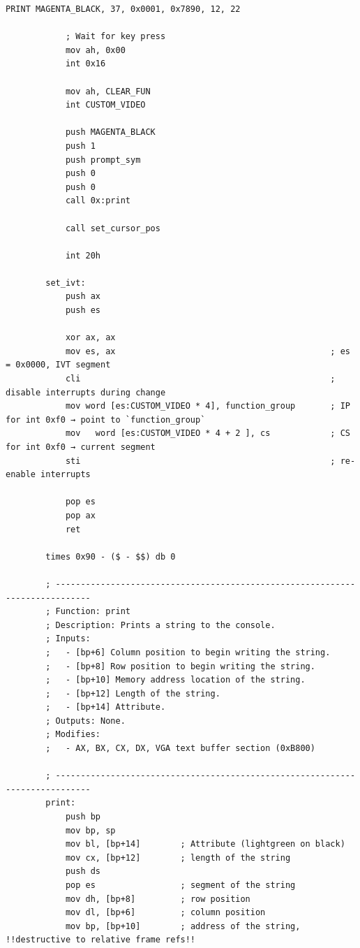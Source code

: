 \documentclass{article}
\begin{document}
\begin{lstlisting}[caption={os623V05.asm listing}, captionpos=t]
            PRINT MAGENTA_BLACK, 37, 0x0001, 0x7890, 12, 22

            ; Wait for key press
            mov ah, 0x00
            int 0x16

            mov ah, CLEAR_FUN
            int CUSTOM_VIDEO

            push MAGENTA_BLACK
            push 1
            push prompt_sym
            push 0
            push 0
            call 0x:print

            call set_cursor_pos

            int 20h

        set_ivt:
            push ax
            push es

            xor ax, ax
            mov es, ax                                           ; es = 0x0000, IVT segment
            cli                                                  ; disable interrupts during change
            mov word [es:CUSTOM_VIDEO * 4], function_group       ; IP for int 0xf0 → point to `function_group`
            mov   word [es:CUSTOM_VIDEO * 4 + 2 ], cs            ; CS for int 0xf0 → current segment
            sti                                                  ; re-enable interrupts

            pop es
            pop ax
            ret

        times 0x90 - ($ - $$) db 0

        ; -----------------------------------------------------------------------------
        ; Function: print
        ; Description: Prints a string to the console.
        ; Inputs:
        ;   - [bp+6] Column position to begin writing the string.
        ;   - [bp+8] Row position to begin writing the string.
        ;   - [bp+10] Memory address location of the string.
        ;   - [bp+12] Length of the string.
        ;   - [bp+14] Attribute.
        ; Outputs: None.
        ; Modifies:
        ;   - AX, BX, CX, DX, VGA text buffer section (0xB800)

        ; -----------------------------------------------------------------------------
        print:
            push bp
            mov bp, sp
            mov bl, [bp+14]        ; Attribute (lightgreen on black)
            mov cx, [bp+12]        ; length of the string
            push ds
            pop es                 ; segment of the string
            mov dh, [bp+8]         ; row position
            mov dl, [bp+6]         ; column position
            mov bp, [bp+10]        ; address of the string, !!destructive to relative frame refs!!


\end{lstlisting}
\end{document}
